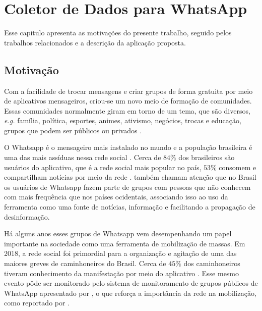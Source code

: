 \chapter{Coletor de Dados para WhatsApp}

Esse capitulo apresenta as motivações do presente trabalho, seguido pelos trabalhos relacionados e a descrição da aplicação proposta.

\section{Motivação}

Com a facilidade de trocar mensagens e criar grupos de forma gratuita por meio de aplicativos mensageiros, criou-se um novo meio de formação de comunidades. Essas comunidades normalmente giram em torno de um tema, que são diversos, \textit{e.g.} família, política, esportes, animes, ativismo, negócios, trocas e educação, grupos que podem ser públicos ou privados \cite{garimella2018whatapp}.

O Whatsapp é o mensageiro mais instalado no mundo \cite{sevitt2018} e a população brasileira é uma das mais assíduas nessa rede social \cite{newman2019reuters}. Cerca de $84\%$ dos brasileiros são usuários do aplicativo, que é a rede social mais popular no país, $53\%$ consomem e compartilham notícias por meio da rede \cite{newman2019reuters}.  também chamam atenção que no Brasil os usuários de Whatsapp fazem parte de grupos com pessoas que não conhecem com mais frequência que nos países ocidentais, associando isso ao uso da ferramenta como uma fonte de notícias, informação e facilitando a propagação de desinformação.

Há alguns anos esses grupos de Whatsapp vem desempenhando um papel importante na sociedade como uma ferramenta de mobilização de massas. Em 2018, a rede social foi primordial para a organização e agitação de uma das maiores greves de caminhoneiros do Brasil. Cerca de $45\%$ dos caminhoneiros tiveram conhecimento da manifestação por meio do aplicativo \cite{deotti2018ipsol}. Esse mesmo evento pôde ser monitorado pelo sistema de monitoramento de grupos públicos de WhatsApp apresentado por , o que reforça a importância da rede na mobilização, como reportado por .

